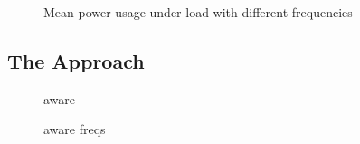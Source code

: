\begin{figure}
    \centering
    
    \caption{Mean power usage under load with different frequencies}
    \label{fig:mean}
\end{figure}

\subsection{The Approach}

\begin{figure}
    \centering
    
    \caption{aware}
    \label{fig:aware}
\end{figure}

\begin{figure}
    \centering
    
    \caption{aware freqs}
    \label{fig:aware_freqs}
\end{figure}
